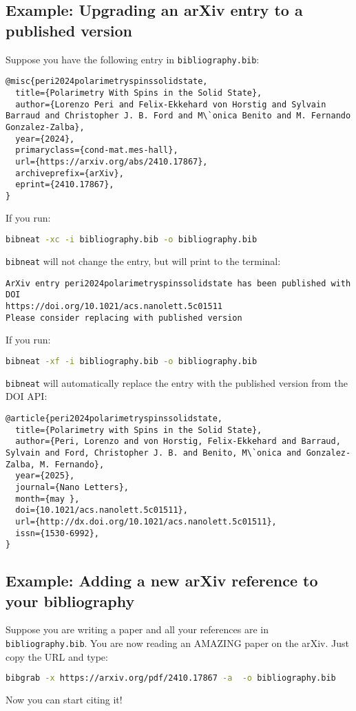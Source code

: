 \documentclass[11pt]{article}
\begin{document}
\subsection*{Example: Upgrading an arXiv entry to a published version}
Suppose you have the following entry in \texttt{bibliography.bib}:
\begin{lstlisting}
@misc{peri2024polarimetryspinssolidstate,
  title={Polarimetry With Spins in the Solid State},
  author={Lorenzo Peri and Felix-Ekkehard von Horstig and Sylvain Barraud and Christopher J. B. Ford and M\`onica Benito and M. Fernando Gonzalez-Zalba},
  year={2024},
  primaryclass={cond-mat.mes-hall},
  url={https://arxiv.org/abs/2410.17867},
  archiveprefix={arXiv},
  eprint={2410.17867},
}
\end{lstlisting}

If you run:
\begin{lstlisting}[language=bash]
bibneat -xc -i bibliography.bib -o bibliography.bib
\end{lstlisting}
\texttt{bibneat} will not change the entry, but will print to the terminal:
\begin{lstlisting}
ArXiv entry peri2024polarimetryspinssolidstate has been published with DOI
https://doi.org/10.1021/acs.nanolett.5c01511
Please consider replacing with published version
\end{lstlisting}

If you run:
\begin{lstlisting}[language=bash]
bibneat -xf -i bibliography.bib -o bibliography.bib
\end{lstlisting}
\texttt{bibneat} will automatically replace the entry with the published version from the DOI API:
\begin{lstlisting}
@article{peri2024polarimetryspinssolidstate,
  title={Polarimetry with Spins in the Solid State},
  author={Peri, Lorenzo and von Horstig, Felix-Ekkehard and Barraud, Sylvain and Ford, Christopher J. B. and Benito, M\`onica and Gonzalez-Zalba, M. Fernando},
  year={2025},
  journal={Nano Letters},
  month={may },
  doi={10.1021/acs.nanolett.5c01511},
  url={http://dx.doi.org/10.1021/acs.nanolett.5c01511},
  issn={1530-6992},
}
\end{lstlisting}

\subsection*{Example: Adding a new arXiv reference to your bibliography}
Suppose you are writing a paper and all your references are in \texttt{bibliography.bib}. You are now reading an AMAZING paper on the arXiv. Just copy the URL and type:
\begin{lstlisting}[language=bash]
bibgrab -x https://arxiv.org/pdf/2410.17867 -a  -o bibliography.bib
\end{lstlisting}
Now you can start citing it!
\end{document}
